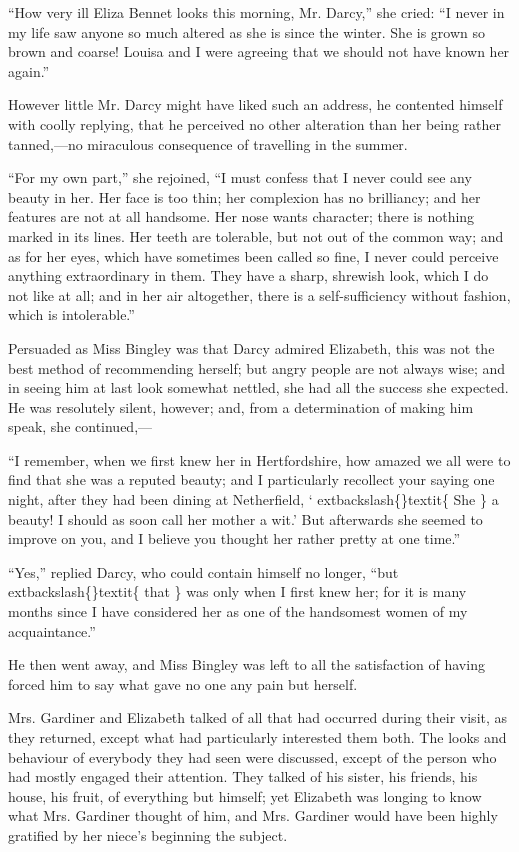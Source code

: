 \documentclass[10pt]{book}
\begin{document}
   “How very ill Eliza Bennet looks this morning, Mr. Darcy,” she cried: “I
never in my life saw anyone so much altered as she is since the winter.
She is grown so brown and coarse! Louisa and I were agreeing that we
should not have known her again.”
  

   However little Mr. Darcy might have liked such an address, he contented
himself with coolly replying, that he perceived no other alteration than
her being rather tanned,—no miraculous consequence of travelling in the
summer.
  

   “For my own part,” she rejoined, “I must confess that I never could see
any beauty in her. Her face is too thin; her complexion has no
brilliancy; and her features are not at all handsome. Her nose wants
character; there is nothing marked in its lines. Her teeth are
tolerable, but not out of the common way; and as for her eyes, which
have sometimes been called so fine, I never could perceive anything
extraordinary in them. They have a sharp, shrewish look, which I do not
like at all; and in her air altogether, there is a self-sufficiency
without fashion, which is intolerable.”
  

   Persuaded as Miss Bingley was that Darcy admired Elizabeth, this was not
the best method of recommending herself; but angry people are not always
wise; and in seeing him at last look somewhat nettled, she had all
   the
success she expected. He was resolutely silent, however; and, from a
determination of making him speak, she continued,—
  

   “I remember, when we first knew her in Hertfordshire, how amazed we all
were to find that she was a reputed beauty; and I particularly recollect
your saying one night, after they had been dining at Netherfield, ‘
   	extbackslash\{\}textit\{
    She
   \}
   a beauty! I should as soon call her mother a wit.’ But afterwards she
seemed to improve on you, and I believe you thought her rather pretty at
one time.”
  

   “Yes,” replied Darcy, who could contain himself no longer, “but
   	extbackslash\{\}textit\{
    that
   \}
   was only when I first knew her; for it is many months since I have
considered her as one of the handsomest women of my acquaintance.”
  

   He then went away, and Miss Bingley was left to all the satisfaction of
having forced him to say what gave no one any pain but herself.
  

   Mrs. Gardiner and Elizabeth talked of all that had occurred during their
visit, as they returned, except what had particularly interested them
both. The looks and behaviour of everybody they had seen were discussed,
except of the person who had mostly engaged their attention. They talked
of his sister, his friends, his house, his fruit, of everything but
himself; yet Elizabeth was longing to know what Mrs. Gardiner thought of
him, and Mrs. Gardiner would have been highly gratified by her niece’s
beginning the subject.
  
\end{document}
